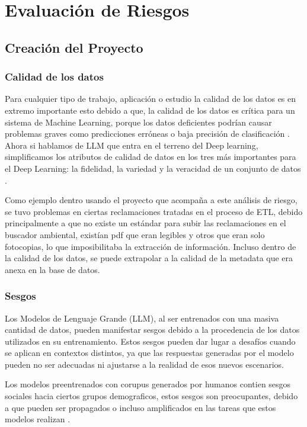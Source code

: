 
\chapter{Evaluación de Riesgos}

\section{Creación del Proyecto}

\subsection{Calidad de los datos}

Para cualquier tipo de trabajo, aplicación o estudio la calidad de los datos es en extremo importante esto debido a que, la calidad de los datos 
es crítica para un sistema de Machine Learning, porque los datos deficientes podrían causar problemas graves como predicciones erróneas o baja 
precisión de clasificación \cite{calidad1}. Ahora si hablamos de LLM que entra en el terreno del Deep learning, simplificamos los atributos de calidad de datos 
en los tres más importantes para el Deep Learning: la fidelidad, la variedad y la veracidad de un conjunto de datos \cite{calidad1}.

Como ejemplo dentro usando el proyecto que acompaña a este análisis de riesgo, se tuvo problemas en ciertas reclamaciones tratadas en el proceso 
de ETL, debido principalmente a que no existe un estándar para subir las reclamaciones en el buscador ambiental, existían pdf que eran legibles y otros 
que eran solo fotocopias, lo que imposibilitaba la extracción de información. Incluso dentro de la calidad de los datos, se puede extrapolar a la 
calidad de la metadata que era anexa en la base de datos.

\subsection{Sesgos} %

Los Modelos de Lenguaje Grande (LLM), al ser entrenados con una masiva cantidad de datos, pueden manifestar sesgos debido a 
la procedencia de los datos utilizados en su entrenamiento. Estos sesgos pueden dar lugar a desafíos cuando se aplican en 
contextos distintos, ya que las respuestas generadas por el modelo pueden no ser adecuadas ni ajustarse a la realidad de 
esos nuevos escenarios.

Los modelos preentrenados con corupus generados por humanos contien sesgos sociales hacia ciertos grupos demograficos, estos
sesgos son preocupantes, debido a que pueden ser propagados o incluso amplificados en las tareas que estos modelos realizan \cite{sesgo2}.

